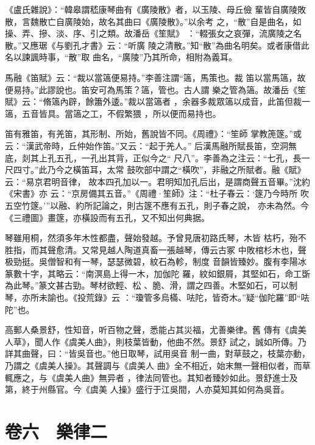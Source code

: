 \documentclass{ctexart}
\begin{document}
《盧氏雜說》：``韓皋謂嵇康琴曲有《廣陵散》者，以玉陵、母丘儉 輩皆自廣陵敗散，言魏散亡自廣陵始，故名其曲曰《廣陵散》。''以余考 之，``散''自是曲名，如操、弄、摻、淡、序、引之類。故潘岳《笙賦》 ：``輟張女之哀彈，流廣陵之名散。''又應琚《与劉孔才書》云：``听廣 陵之清散。''知``散''為曲名明矣。或者康借此名以諫諷時事，``散''取 曲名，``廣陵''乃其所命，相附為義耳。

馬融《笛賦》云：``裁以當簻便易持。''李善注謂``簻，馬策也。裁 笛以當馬簻，故便易持。''此謬說也。笛安可為馬策？簻，管也。古人謂 樂之管為簻。故潘岳《笙賦》云：``脩簻內辟，餘簫外逶。''裁以當簻者 ，余器多裁眾簻以成音，此笛但裁一簻，五音皆具。當簻之工，不假繁猥 ，所以便而易持也。

笛有雅笛，有羌笛，其形制、所始，舊說皆不同。《周禮》：``笙師 掌教箎篴。''或云：``漢武帝時，丘仲始作笛。''又云：``起于羌人。'' 后漢馬融所賦長笛，空洞無底，剡其上孔五孔，一孔出其背，正似今之`` 尺八''。李善為之注云：``七孔，長一尺四寸。''此乃今之橫笛耳，太常 鼓吹部中謂之``橫吹''，非融之所賦者。融《賦》云：``易京君明音律， 故本四孔加以一。君明知加孔后出，是謂商聲五音畢。''沈約《宋書》亦 云：``京房備其五音。''《周禮·笙師》注：``杜子春云：`篴乃今時所 吹五空竹篴。'''以融、約所記論之，則古篴不應有五孔，則子春之說， 亦未為然。今《三禮圖》畫篴，亦橫設而有五孔，又不知出何典据。

琴雖用桐，然須多年木性都盡，聲始發越。予曾見唐初路氏琴，木皆 枯朽，殆不胜指，而其聲愈清。又常見越人陶道真畜一張越琴，傳云古冢 中敗棺杉木也，聲极勁挺。吳僧智和有一琴，瑟瑟微碧，紋石為軫，制度 音韻皆臻妙。腹有李陽冰篆數十字，其略云：``南溟島上得一木，加伽陀 羅，紋如銀屑，其堅如石，命工斲為此琴。''篆文甚古勁。琴材欲輕、松 、脆、滑，謂之四善。木堅如石，可以制琴，亦所未諭也。《投荒錄》云 ：``瓊管多烏樠、呿陀，皆奇木。''疑``伽陀羅''即``呿陀''也。

高郵人桑景舒，性知音，听百物之聲，悉能占其災福，尤善樂律。舊 傳有《虞美人草》，聞人作《虞美人曲》，則枝葉皆動，他曲不然。景舒 試之，誠如所傳。乃詳其曲聲，曰：``皆吳音也。''他日取琴，試用吳音 制一曲，對草鼓之，枝葉亦動，乃謂之《虞美人操》。其聲調与《虞美人 曲》全不相近，始末無一聲相似者，而草輒應之，与《虞美人曲》無异者 ，律法同管也。其知者臻妙如此。景舒進士及第，終于州縣官。今《虞美 人操》盛行于江吳間，人亦莫知其如何為吳音。
\clearpage
\section{卷六　樂律二}
\end{document}
